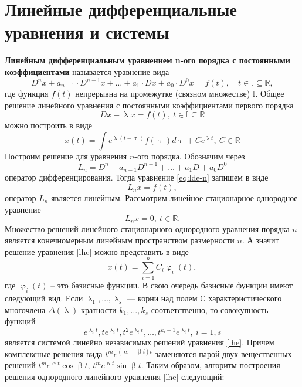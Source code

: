 \documentclass[a4paper, 12pt]{report}
\numberwithin{equation}{section}
\renewcommand{\alpha}{\upalpha}
\renewcommand{\beta}{\upbeta}
\renewcommand{\phi}{\upvarphi}
\renewcommand{\tau}{\uptau}
\renewcommand{\lambda}{\uplambda}
\begin{document}
		\section{Линейные дифференциальные уравнения и системы}	
	\textbf{Линейным дифференциальным уравнением n-ого порядка с постоянными коэффициентами} называется уравнение вида \begin{equation}
			\label{eq:lde-n}	
			D^nx + a_{n-1}\cdot D^{n-1}x + \ldots + a_1\cdot Dx + a_0\cdot D^0x = f(t),\quad t\in \mathbb{I}\subseteq\mathbb{R},
		\end{equation} 
		где функция $f(t)$ непрерывна на промежутке (связном множестве) $\mathbb{I}$. Общее решение линейного уравнения с постоянными коэффициентами первого порядка
		\begin{equation}
			Dx - \lambda x = f(t),\ t\in\mathbb{I}\subseteq\mathbb{R}
		\end{equation} 
		можно построить в виде
		\begin{equation}
			x(t) = \int\limits e^{\lambda (t-\tau)}f(\tau)d\tau + C e^{\lambda t},\ C \in \mathbb R
		\end{equation}
	\noindent
	Построим решение для уравнения $n$-ого порядка. Обозначим через 
	\begin{equation}
		L_n = D^n + a_{n-1}D^{n-1} + \ldots + a_1D + a_0D^0
	\end{equation} 
	оператор дифференцирования. Тогда уравнение \eqref{eq:lde-n} запишем в виде 
	\begin{equation}
		L_nx=f(t),
	\end{equation}
	оператор $L_n$ является линейным.
	\noindent
	Рассмотрим линейное стационарное однородное уравнение 
	\begin{equation}
		\label{lhe}
		L_nx = 0,\ t\in \mathbb{R}.
	\end{equation}
	Множество решений линейного стационарного однородного уравнения порядка $n$ является конечномерным линейным пространством размерности $n$. А значит решение уравнения \eqref{lhe} можно представить в виде
	\begin{equation}
		x(t) = \sum_{i=1}^n C_i \phi_i(t),
	\end{equation}
	где $\phi_i(t)$ -- это базисные функции. В свою очередь базисные функции имеют следующий вид. Если $\lambda_1,\ldots,\lambda_s$ --- корни над полем $\mathbb C$ характеристического многочлена $\Delta(\lambda)$ кратности $k_1,\ldots,k_s$ соответственно, то совокупность функций $$e^{\lambda_it}, te^{\lambda_it}, t^2e^{\lambda_it},\ldots,t^{k_i-1}e^{\lambda_it},\ i=\overline{1,s}$$ является системой линейно независимых решений уравнения \eqref{lhe}. Причем комплексные решения вида $t^m e^{(\alpha+\beta i)t}$ заменяются парой двух вещественных решений $t^m e^{\alpha t}\cos \beta t$, $t^m e^{\alpha t}\sin \beta t$. Таким образом, алгоритм построения решения однородного линейного уравнения \eqref{lhe} следующий:
\end{document}
